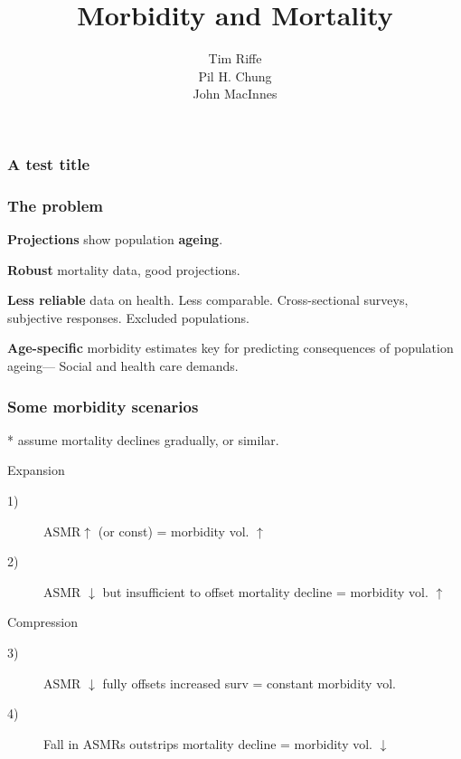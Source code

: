 \documentclass[20pt]{beamer}
\title{Morbidity and Mortality}
\subtitle{Tim Riffe\\ Pil H. Chung\\ John MacInnes}
\begin{document}
\begin{frame}
	\titlepage
\end{frame}


\begin{frame}
\frametitle{A test title}
\begin{figure}[b]
    \centering
\end{figure} 
\end{frame}
\begin{frame}%
\frametitle{The problem}
  \begin{description}
    \item<1->{\textbf{Projections}} show population \textbf{ageing}.
    \item<2->{\textbf{Robust}} mortality data, good projections.
    \item<3->{\textbf{Less reliable}} data on health. Less comparable.
    Cross-sectional surveys, subjective responses. Excluded populations.
    \item<4->{\textbf{Age-specific}} morbidity estimates key for predicting
    consequences of population ageing--- Social and health care demands.
  \end{description}
\end{frame}	



\begin{frame}
\frametitle{Some morbidity scenarios}
* assume mortality declines gradually, or similar.
\begin{block}{Expansion}
\begin{description}
\item[1)] ASMR\footnotemark $\uparrow$ (or
const) = morbidity vol. $\uparrow$
\item[2)] ASMR $\downarrow$ but insufficient to offset mortality
                  decline = morbidity vol. $\uparrow$
\end{description}
\end{block}

\begin{block}{Compression}
\begin{description}
\item[3)]ASMR $\downarrow$ fully offsets increased surv = constant morbidity
vol.
\item[4)] Fall in ASMRs outstrips mortality decline = morbidity vol. $\downarrow$
\end{description}
\end{block}
\end{frame}	
\end{document}
